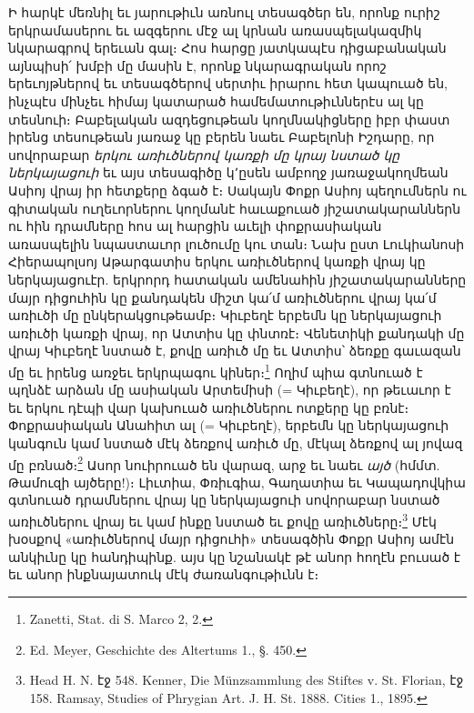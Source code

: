 \documentclass{article}
\begin{document}
{Ի հարկէ մեռնիլ եւ յարութիւն առնուլ տեսագծեր են, որոնք ուրիշ երկրամասերու եւ ազգերու մէջ ալ կրնան առասպելակազմիկ նկարագրով երեւան գալ։ Հոս հարցը յատկապէս դիցաբանական այնպիսի՛ խմբի մը մասին է, որոնք նկարագրական որոշ երեւոյթներով եւ տեսագծերով սերտիւ իրարու հետ կապուած են, ինչպէս մինչեւ հիմայ կատարած համեմատութիւններէս ալ կը տեսնուի։ Բաբելական ազդեցութեան կողմնակիցները իբր փաստ իրենց տեսութեան յառաջ կը բերեն նաեւ Բաբելոնի Իշդարը, որ սովորաբար \emph{երկու առիւծներով կառքի մը կրայ նստած կը ներկայացուի} եւ այս տեսագիծը կ՚ըսեն ամբողջ յառաջակողմեան Ասիոյ վրայ իր հետքերը ձգած է։ Սակայն Փոքր Ասիոյ պեղումներն ու գիտական ուղեւորներու կողմանէ հաւաքուած յիշատակարաններն ու հին դրամները հոս ալ հարցին աւելի փոքրասիական առասպելին նպաստաւոր լուծումը կու տան։ Նախ ըստ Լուկիանոսի Հիերապոլսոյ Աթարգատիս երկու առիւծներով կառքի վրայ կը ներկայացուէր. երկրորդ հատական ամենահին յիշատակարանները մայր դիցուհին կը քանդակեն միշտ կա՛մ առիւծներու վրայ կա՛մ առիւծի մը ընկերակցութեամբ։ Կիւբեղէ երբեմն կը ներկայացուի առիւծի կառքի վրայ, որ Ատտիս կը փնտռէ։ Վենետիկի քանդակի մը վրայ Կիւբեղէ նստած է, քովը առիւծ մը եւ Ատտիս՝ ձեռքը գաւազան մը եւ իրենց առջեւ երկրպագու կիներ։\footnote{Zanetti, Stat. di S. Marco 2, 2.} Ողիմ պիա գտնուած է պղնձէ արձան մը ասիական Արտեմիսի (= Կիւբեղէ), որ թեւաւոր է եւ երկու դէպի վար կախուած առիւծներու ոտքերը կը բռնէ։ Փոքրասիական Անահիտ ալ (= Կիւբեղէ), երբեմն կը ներկայացուի կանգուն կամ նստած մէկ ձեռքով առիւծ մը, մէկալ ձեռքով ալ յովազ մը բռնած։\footnote{Ed. Meyer, Geschichte des Altertums 1., §. 450.} Ասոր նուիրուած են վարազ, արջ եւ նաեւ \emph{այծ} (հմմտ. Թամուզի այծերը!)։ Լիւտիա, Փռիւգիա, Գաղատիա եւ Կապադովկիա գտնուած դրամներու վրայ կը ներկայացուի սովորաբար նստած առիւծներու վրայ եւ կամ ինքը նստած եւ քովը առիւծները։\footnote{Head H. N. էջ 548. Kenner, Die Münzsammlung des Stiftes v. St. Florian, էջ 158. Ramsay, Studies of Phrygian Art. J. H. St. 1888. Cities 1., 1895.} Մէկ խօսքով «առիւծներով մայր դիցուհի» տեսագծին Փոքր Ասիոյ ամէն անկիւնը կը հանդիպինք. այս կը նշանակէ թէ անոր հողէն բուսած է եւ անոր ինքնայատուկ մէկ ժառանգութիւնն է։

}
\end{document}
